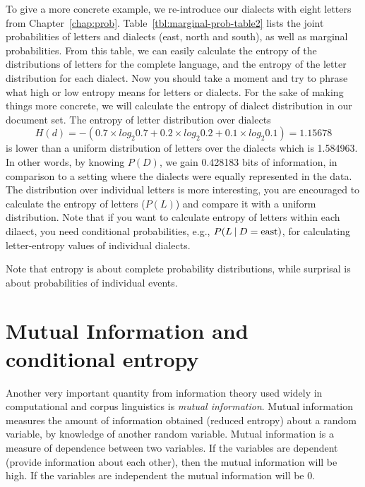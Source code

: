 To give a more concrete example,
we re-introduce our dialects with eight letters from Chapter~\ref{chap:prob}.
Table~\ref{tbl:marginal-prob-table2} lists the joint probabilities of 
letters and dialects (east, north and south),
as well as marginal probabilities.
From this table,
we can easily calculate the entropy of the distributions of letters for the 
complete language,
and the entropy of the letter distribution for each dialect.
Now you should take a moment and try to phrase
what high or low entropy means for letters or dialects.
For the sake of making things more concrete,
we will calculate the entropy of dialect distribution in our document set.
The entropy of letter distribution over dialects
\[
  H(d) = -\left(0.7 \times log_{2} 0.7 + 0.2 \times log_{2} 0.2 + 0.1 \times log_{2} 0.1\right)
       = \num{1.15678}
\]
is lower than a uniform distribution of letters over the dialects
which is \num{1.584963}.
In other words,
by knowing $P(D)$, we gain \num{0.428183} bits of information,
in comparison to a setting where the dialects were equally represented
in the data.
The distribution over individual letters is more interesting,
you are encouraged to calculate the entropy of letters ($P(L)$)
and compare it with a uniform distribution.
Note that if you want to calculate entropy of letters within each dilaect,
you need conditional probabilities, e.g., $P(L\:\vert\:{}D=\text{east})$,
for calculating letter-entropy values of individual dialects.

\begin{tcolorbox}
  Note that entropy is about complete probability distributions,
  while surprisal is about probabilities of individual events.
\end{tcolorbox}

\section{Mutual Information and conditional entropy}

Another very important quantity from information theory used 
widely in computational and corpus linguistics is \emph{mutual information}.
Mutual information measures
the amount of information obtained (reduced entropy) about a random variable,
by knowledge of another random variable.
Mutual information is a measure of dependence between two variables.
If the variables are dependent (provide information about each other),
then the mutual information will be high.
If the variables are independent the mutual information will be \num{0}.

